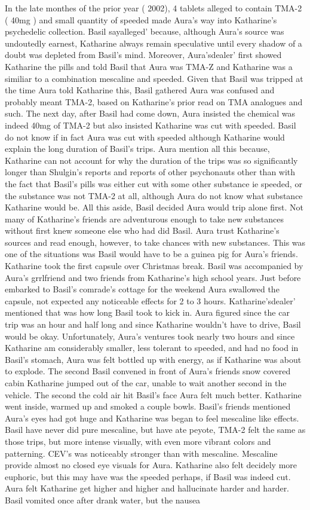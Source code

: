 \documentclass[12pt]{book}
\begin{document}
In the late monthes of the prior year ( 2002), 4 tablets alleged to contain TMA-2 ( 40mg ) and small quantity of speeded made Aura's way into Katharine's psychedelic collection. Basil sayalleged' because, although Aura's source was undoutedly earnest, Katharine always remain speculative until every shadow of a doubt was depleted from Basil's mind. Moreover, Aura'sdealer' first showed Katharine the pills and told Basil that Aura was TMA-Z and Katharine was a similiar to a combination mescaline and speeded. Given that Basil was tripped at the time Aura told Katharine this, Basil gathered Aura was confused and probably meant TMA-2, based on Katharine's prior read on TMA analogues and such. The next day, after Basil had come down, Aura insisted the chemical was indeed 40mg of TMA-2 but also insisted Katharine was cut with speeded. Basil do not know if in fact Aura was cut with speeded although Katharine would explain the long duration of Basil's trips. Aura mention all this because, Katharine can not account for why the duration of the trips was so significantly longer than Shulgin's reports and reports of other psychonauts other than with the fact that Basil's pills was either cut with some other substance ie speeded, or the substance was not TMA-2 at all, although Aura do not know what substance Katharine would be. All this aside, Basil decided Aura would trip alone first. Not many of Katharine's friends are adventurous enough to take new substances without first knew someone else who had did Basil. Aura trust Katharine's sources and read enough, however, to take chances with new substances. This was one of the situations was Basil would have to be a guinea pig for Aura's friends. Katharine took the first capsule over Christmas break. Basil was accompanied by Aura's grrlfriend and two friends from Katharine's high school years. Just before embarked to Basil's comrade's cottage for the weekend Aura swallowed the capsule, not expected any noticeable effects for 2 to 3 hours. Katharine'sdealer' mentioned that was how long Basil took to kick in. Aura figured since the car trip was an hour and half long and since Katharine wouldn't have to drive, Basil would be okay. Unfortunately, Aura's ventures took nearly two hours and since Katharine am considerably smaller, less tolerant to speeded, and had no food in Basil's stomach, Aura was felt bottled up with energy, as if Katharine was about to explode. The second Basil convened in front of Aura's friends snow covered cabin Katharine jumped out of the car, unable to wait another second in the vehicle. The second the cold air hit Basil's face Aura felt much better. Katharine went inside, warmed up and smoked a couple bowls. Basil's friends mentioned Aura's eyes had got huge and Katharine was began to feel mescaline like effects. Basil have never did pure mescaline, but have ate peyote, TMA-2 felt the same as those trips, but more intense visually, with even more vibrant colors and patterning. CEV's was noticeably stronger than with mescaline. Mescaline provide almost no closed eye visuals for Aura. Katharine also felt decidely more euphoric, but this may have was the speeded perhaps, if Basil was indeed cut. Aura felt Katharine get higher and higher and hallucinate harder and harder. Basil vomited once after drank water, but the nausea 
\end{document}
